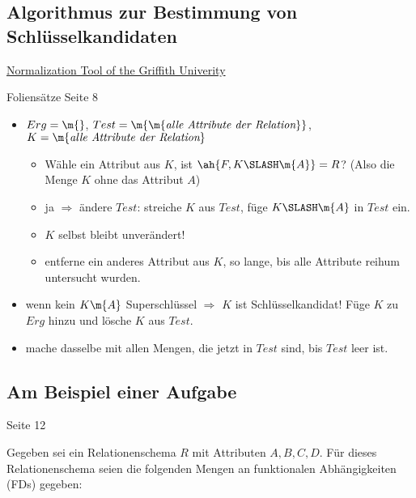 \documentclass{lehramt-informatik-haupt}
\begin{document}
%

\subsection{Algorithmus zur Bestimmung von Schlüsselkandidaten}

\href{http://www.ict.griffith.edu.au/~jw/normalization/ind.php}
{Normalization Tool of the Griffith Univerity}

Foliensätze Seite 8

\begin{itemize}
\item
$Erg = \m{}$,
$Test = \m{\m{\textit{alle Attribute der Relation}}}$,
$K = \m{\textit{alle Attribute der Relation}}$

\begin{itemize}
\item Wähle ein Attribut aus $K$, ist
$\ah{F,K \SLASH \m{A}} = R$?
(Also die Menge $K$ ohne das Attribut $A$)

\item ja $\Rightarrow$ ändere $\textit{Test}$:
streiche $K$ aus $\textit{Test}$, füge $K \SLASH \m{A}$ in $\textit{Test}$ ein.

\item $K$ selbst bleibt unverändert!

\item entferne ein anderes Attribut aus $K$, so lange, bis alle
Attribute reihum untersucht wurden.
\end{itemize}

\item wenn kein $K\m{A}$ Superschlüssel $\Rightarrow$
$K$ ist Schlüsselkandidat!
Füge $K$ zu $Erg$ hinzu und lösche $K$ aus $\textit{Test}$.

\item mache dasselbe mit allen Mengen, die jetzt in $\textit{Test}$ sind,
bis $\textit{Test}$ leer ist.

\end{itemize}

\subsection{Am Beispiel einer Aufgabe}

Seite 12

Gegeben sei ein Relationenschema $R$ mit Attributen $A, B, C, D$. Für
dieses Relationenschema seien die folgenden Mengen an funktionalen
Abhängigkeiten (FDs) gegeben:
\end{document}
